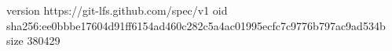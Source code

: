 version https://git-lfs.github.com/spec/v1
oid sha256:ee0bbbe17604d91ff6154ad460c282c5a4ac01995ecfc7c9776b797ac9ad534b
size 380429
